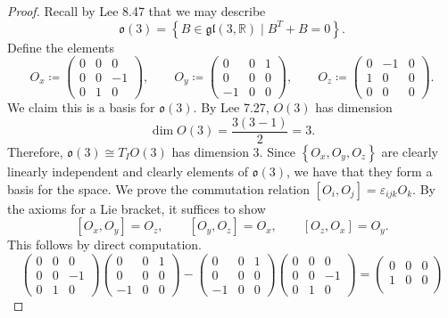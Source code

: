 \documentclass[11pt, letterpaper]{article}
\begin{document}
\begin{proof}
	Recall by Lee 8.47 that we may describe
	\[
		\mathfrak{o} (3)=\left\{ B\in \mathfrak{gl} (3,\mathbb{R} )\mid B^T+B=0 \right\} 
	.\]
	Define the elements
	\[
		O_x \coloneqq \begin{pmatrix}
		0 & 0 & 0 \\
		0 & 0 & -1 \\
		0 & 1 & 0
		\end{pmatrix},\qquad O_y \coloneqq \begin{pmatrix}
		0 & 0 & 1 \\
		0 & 0 & 0 \\
		-1 & 0 & 0
		\end{pmatrix},\qquad O_z \coloneqq \begin{pmatrix}
		0 & -1 & 0 \\
		1 & 0 & 0 \\
		0 & 0 & 0
		\end{pmatrix}
	.\]
	We claim this is a basis for $\mathfrak{o} (3)$. By Lee 7.27, $O(3)$ has dimension
	\[
		\dim O(3)=\frac{3(3-1)}{2} =3
	.\]
	Therefore, $\mathfrak{o} (3) \cong T_IO(3)$ has dimension 3. Since $\left\{ O_x,O_y,O_z \right\} $ are clearly linearly independent and clearly elements of $\mathfrak{o} (3)$, we have that they form a basis for the space. We prove the commutation relation $[O_i,O_j]=\varepsilon_{ijk} O_k$. By the axioms for a Lie bracket, it suffices to show
	\[
		[O_x,O_y]=O_z,\qquad [O_y,O_z]=O_x,\qquad [O_z,O_x]=O_y
	.\]
	This follows by direct computation.
	\[
		\begin{pmatrix}
		0 & 0 & 0 \\
		0 & 0 & -1 \\
		0 & 1 & 0
		\end{pmatrix}\begin{pmatrix}
		0 & 0 & 1 \\
		0 & 0 & 0 \\
		-1 & 0 & 0
		\end{pmatrix}-\begin{pmatrix}
		0 & 0 & 1 \\
		0 & 0 & 0 \\
		-1 & 0 & 0
		\end{pmatrix}\begin{pmatrix}
		0 & 0 & 0 \\
		0 & 0 & -1 \\
		0 & 1 & 0
		\end{pmatrix}=\begin{pmatrix}
		0 & 0 & 0 \\
		1 & 0 & 0 \\

\end{pmatrix}\]
\end{proof}
\end{document}

